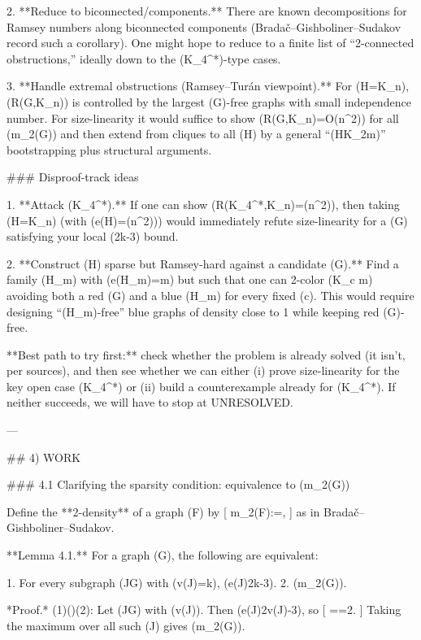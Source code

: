 2. **Reduce to biconnected/components.**
   There are known decompositions for Ramsey numbers along biconnected components (Bradač–Gishboliner–Sudakov record such a corollary). One might hope to reduce to a finite list of “2-connected obstructions,” ideally down to the (K_4^*)-type cases.

3. **Handle extremal obstructions (Ramsey–Turán viewpoint).**
   For (H=K_n), (R(G,K_n)) is controlled by the largest (G)-free graphs with small independence number. For size-linearity it would suffice to show (R(G,K_n)=O(n^2)) for all (m_2(G)) and then extend from cliques to all (H) by a general “(H\subseteq K_{2m})” bootstrapping plus structural arguments.

### Disproof-track ideas

1. **Attack (K_4^*).**
   If one can show (R(K_4^*,K_n)=\omega(n^2)), then taking (H=K_n) (with (e(H)=\Theta(n^2))) would immediately refute size-linearity for a (G) satisfying your local (2k-3) bound.

2. **Construct (H) sparse but Ramsey-hard against a candidate (G).**
   Find a family (H_m) with (e(H_m)=m) but such that one can 2-color (K_{c m}) avoiding both a red (G) and a blue (H_m) for every fixed (c). This would require designing “(H_m)-free” blue graphs of density close to 1 while keeping red (G)-free.

**Best path to try first:** check whether the problem is already solved (it isn’t, per sources), and then see whether we can either (i) prove size-linearity for the key open case (K_4^*) or (ii) build a counterexample already for (K_4^*). If neither succeeds, we will have to stop at UNRESOLVED.

---

## 4) WORK

### 4.1 Clarifying the sparsity condition: equivalence to (m_2(G))

Define the **2-density** of a graph (F) by
[
m_2(F):=\max{},
]
as in Bradač–Gishboliner–Sudakov.

**Lemma 4.1.** For a graph (G), the following are equivalent:

1. For every subgraph (J\subseteq G) with (v(J)=k), (e(J)\le 2k-3).
2. (m_2(G)).

*Proof.*
(1)(\Rightarrow)(2): Let (J\subseteq G) with (v(J)). Then (e(J)\le 2v(J)-3), so
[
\le {}==2.
]
Taking the maximum over all such (J) gives (m_2(G)).

